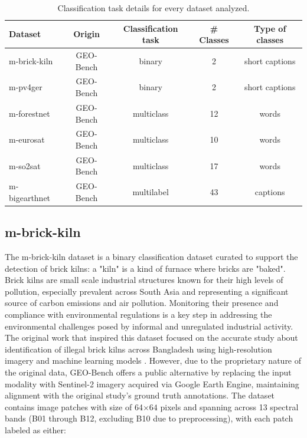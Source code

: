 \documentclass[a4paper, oneside, english]{sapthesis} %
\begin{document}
\begin{table}[ht]
\centering
\footnotesize
\renewcommand{\arraystretch}{1.2}
    \begin{tabular}{lcccc}
    \toprule
    \textbf{Dataset} & \textbf{Origin} & \textbf{Classification task} & \textbf{\# Classes} & \textbf{Type of classes}  \\
    \midrule
    m-brick-kiln & GEO-Bench & binary & 2 & short captions \\
    m-pv4ger & GEO-Bench & binary & 2 & short captions \\
    m-forestnet & GEO-Bench & multiclass & 12 & words \\
    m-eurosat & GEO-Bench & multiclass & 10 & words \\
    m-so2sat & GEO-Bench & multiclass & 17 & words \\
    m-bigearthnet & GEO-Bench & multilabel & 43 & captions \\
    \bottomrule
    \end{tabular}
\vspace{0.3cm}
\caption{\normalsize Classification task details for every dataset analyzed.}
\label{tab:geoclasstypes}
\end{table}

\subsection{m-brick-kiln}

The m-brick-kiln dataset is a binary classification dataset curated to support the detection of brick kilns: a "kiln" is a kind of furnace where bricks are "baked". Brick kilns are small scale industrial structures known for their high levels of pollution, especially prevalent across South Asia and representing a significant source of carbon emissions and air pollution. Monitoring their presence and compliance with environmental regulations is a key step in addressing the environmental challenges posed by informal and unregulated industrial activity.
The original work that inspired this dataset focused on the accurate study about identification of illegal brick kilns across Bangladesh using high-resolution imagery and machine learning models \cite{lee2021scalable}. However, due to the proprietary nature of the original data, GEO-Bench offers a public alternative by replacing the input modality with Sentinel-2 imagery acquired via Google Earth Engine, maintaining alignment with the original study’s ground truth annotations.
The dataset contains image patches with size of 64$\times64$ pixels and spanning across 13 spectral bands (B01 through B12, excluding B10 due to preprocessing), with each patch labeled as either:
\end{document}
